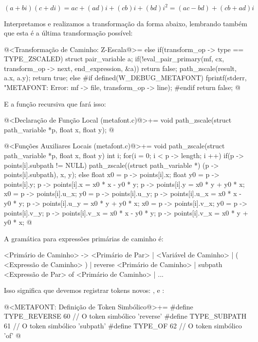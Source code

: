 {$$
(a+bi)(c+di) = ac + (ad)i + (cb)i + (bd)i^2 = (ac - bd) + (cb+ad)i
$$

Interpretamos e realizamos a transformação da forma abaixo, lembrando
também que esta é a última transformação possível:

\iniciocodigo
 @<Transformação de Caminho: Z-Escala@>=
else if(transform_op -> type == TYPE_ZSCALED){
  struct pair_variable a;
  if(!eval_pair_primary(mf, cx, transform_op -> next, end_expression, &a))
    return false;
  path_zscale(result, a.x, a.y);  
  return true;
}
else{
#if defined(W_DEBUG_METAFONT)
  fprintf(stderr, "METAFONT: Error: %
          mf -> file, transform_op -> line);
#endif
  return false;
}
@
\fimcodigo

E a função recursiva que fará isso:

\iniciocodigo
@<Declaração de Função Local (metafont.c)@>+=
void path_zscale(struct path_variable *p, float x, float y);
@
\fimcodigo

\iniciocodigo
@<Funções Auxiliares Locais (metafont.c)@>+=
void path_zscale(struct path_variable *p, float x, float y){
  int i;
  for(i = 0; i < p -> length; i ++){
    if(p -> points[i].subpath != NULL)
      path_zscale((struct path_variable *) (p -> points[i].subpath),
                  x, y);
    else{
      float x0 = p -> points[i].x;
      float y0 = p -> points[i].y;
      p -> points[i].x = x0 * x - y0 * y;
      p -> points[i].y = x0 * y + y0 * x;
      x0 = p -> points[i].u_x;
      y0 = p -> points[i].u_y;
      p -> points[i].u_x = x0 * x - y0 * y;
      p -> points[i].u_y = x0 * y + y0 * x;
      x0 = p -> points[i].v_x;
      y0 = p -> points[i].v_y;
      p -> points[i].v_x = x0 * x - y0 * y;
      p -> points[i].v_x = x0 * y + y0 * x;
    }
  }
}
@
\fimcodigo



A gramática para expressões primárias de caminho é:

\alinhaverbatim
<Primário de Caminho> -> <Primário de Par> | <Variável de Caminho> |
                       ( <Expressão de Caminho> ) |
                       reverse <Primário de Caminho> |
                       subpath <Expressão de Par> of <Primário de Caminho> |
                       ...
\alinhanormal

Isso significa que devemos registrar tokens
novos: ,  e :

\iniciocodigo
@<METAFONT: Definição de Token Simbólico@>+=
#define TYPE_REVERSE        60 // O token simbólico 'reverse'
#define TYPE_SUBPATH        61 // O token simbólico 'subpath'
#define TYPE_OF             62 // O token simbólico 'of'
@
\fimcodigo

}
